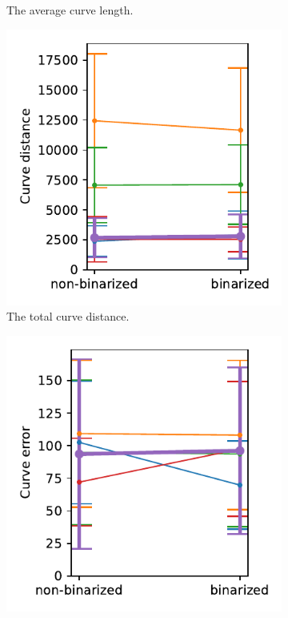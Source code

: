 \begin{figure}[h]
\begin{subfigure}{.3\textwidth}
    \caption{The average curve length.}
\end{subfigure}
    \begin{subfigure}{.3\textwidth}
    \centering
    \includegraphics[width=\textwidth]{graphics/eval/curve distance_True_1024-1.024_sketchbench.pdf}
    \caption{The total curve distance.}
\end{subfigure}
    \begin{subfigure}{.3\textwidth}
    \centering
    \includegraphics[width=\textwidth]{graphics/eval/curve error_True_1024-1.024_sketchbench.pdf}

\end{subfigure}
\end{figure}
